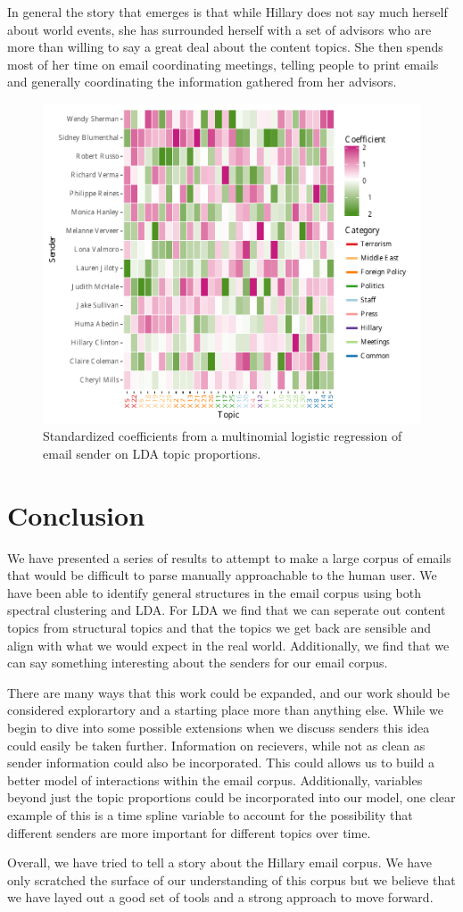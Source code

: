 \documentclass[12pt]{article}
\theoremstyle{definition}
\theoremstyle{algodesc}
\begin{document}
In general the story that emerges is that while Hillary does not say much herself about world events, she has surrounded herself with a set of advisors who are more than willing to say a great deal about the content topics.  She then spends most of her time on email coordinating meetings, telling people to print emails and generally coordinating the information gathered from her advisors.

\begin{figure}[htb] \centering
  \includegraphics[width=0.95\linewidth]{../images/coefficients.pdf}
  \caption{Standardized coefficients from a multinomial logistic regression of email sender on LDA topic proportions.}
  \label{fig:coefficients}
\end{figure}


\section{Conclusion}
We have presented a series of results to attempt to make a large corpus of emails that would be difficult to parse manually approachable to the human user.  We have been able to identify general structures in the email corpus using both spectral clustering and LDA.  For LDA we find that we can seperate out content topics from structural topics and that the topics we get back are sensible and align with what we would expect in the real world.  Additionally, we find that we can say something interesting about the senders for our email corpus.

There are many ways that this work could be expanded, and our work should be considered explorartory and a starting place more than anything else.  While we begin to dive into some possible extensions when we discuss senders this idea could easily be taken further.  Information on recievers, while not as clean as sender information could also be incorporated.  This could allows us to build a better model of interactions within the email corpus.  Additionally, variables beyond just the topic proportions could be incorporated into our model, one clear example of this is a time spline variable to account for the possibility that different senders are more important for different topics over time.

Overall, we have tried to tell a story about the Hillary email corpus.  We have only scratched the surface of our understanding of this corpus but we believe that we have layed out a good set of tools and a strong approach to move forward.
\end{document}
